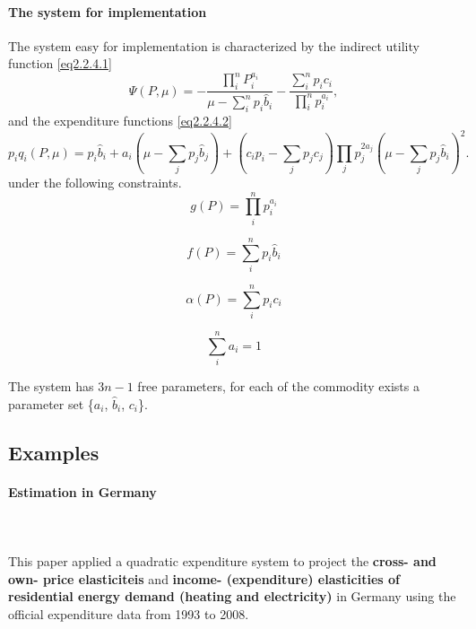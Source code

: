\paragraph{The system for implementation\\}{
	The system easy for implementation is characterized by the indirect utility function \cref{eq2.2.4.1} 
	\begin{equation}\label{eq2.2.4.1}
		\Psi(P,\mu) = -\frac{\prod_i^n P_i^{a_i}}{\mu - \sum_{i}^{n} p_i {\widehat b}_i} - \frac{\sum_{i}^{n} p_i c_i}{\prod_{i}^{n}p_i^{a_i}},
	\end{equation}
	and the expenditure functions \cref{eq2.2.4.2}
	\begin{equation}\label{eq2.2.4.2}
		p_i q_i(P,\mu) = p_i \widehat{b}_i + a_i (\mu - \sum_{j} p_j \widehat{b}_j) + (c_i p_i - \sum_{j} p_j c_j) \prod_{j} p_j^{2a_j}(\mu - \sum_j p_j \widehat{b}_i)^2.
	\end{equation}	
	under the following constraints.
	\begin{equation}\label{eq2.2.4a}
		g(P) = \prod_{i}^{n}p_i^{a_i}
	\end{equation}

	\begin{equation}\label{eq2.2.4b}
		f(P) = \sum_{i}^{n} p_i \widehat{b}_i
	\end{equation}

	\begin{equation}\label{eq2.2.4c}
		\alpha (P)= \sum_{i}^{n} p_i c_i
	\end{equation}

	\begin{equation}\label{eq2.2.4d}
		\sum_{i}^{n} a_i = 1
	\end{equation}

	The system has $3n-1$ free parameters, for each of the commodity exists a parameter set \{$a_i$, $\widehat{b}_i$, $c_i$\}.
 }




\subsection{Examples}
\paragraph{Estimation in Germany\\}{\cite{SCHULTE2017512}\\}

\paragraph{}{This paper applied a quadratic expenditure system to project the \textbf{cross- and own- price elasticiteis} and \textbf{income- (expenditure) elasticities of residential energy demand (heating and electricity)} in Germany using the official expenditure data from 1993 to 2008.}

